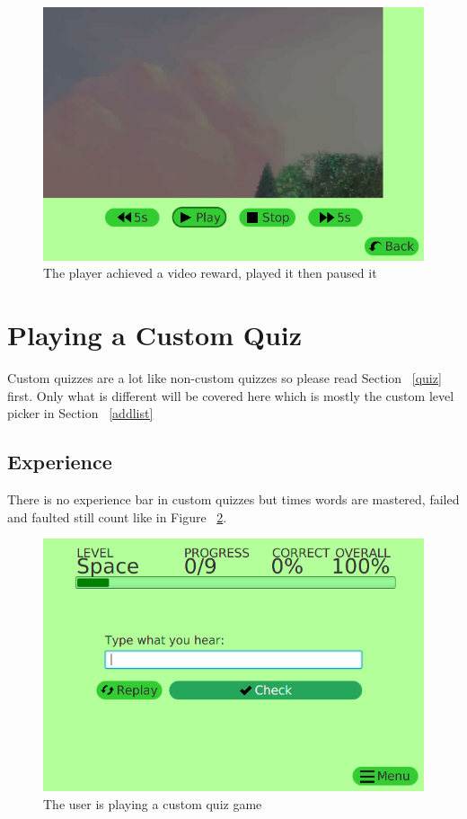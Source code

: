 \documentclass[12pt,a4paper,titlepage,onecolumn]{article}
\begin{document}
			\begin{figure}
			\centering
			\includegraphics[width=1\linewidth]{Figures/NewQuiz/VideoReward/VideoRewardPaused}
			\caption[Video Reward Paused]{The player achieved a video reward, played it then paused it}
			\label{fig:VideoRewardPaused}
			\end{figure}


	\section{Playing a Custom Quiz}
	Custom quizzes are a lot like non-custom quizzes so please read Section ~\ref{quiz} first. Only what is different will be covered here which is mostly the custom level picker in Section ~\ref{addlist}
		\subsection{Experience}
		There is no experience bar in custom quizzes but times words are mastered, failed and faulted still count like in Figure ~\ref{fig:CustomQuiz}.
		\begin{figure}[h]
		\centering
		\includegraphics[width=1\linewidth]{Figures/CustomQuiz/CustomQuiz}
		\caption[Custom Quiz]{The user is playing a custom quiz game}
		\label{fig:CustomQuiz}
		\end{figure}
\end{document}

